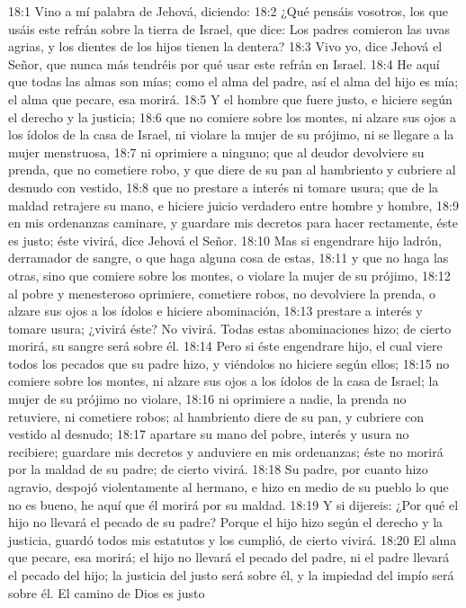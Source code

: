 18:1 Vino a mí palabra de Jehová, diciendo:   
18:2 ¿Qué pensáis vosotros, los que usáis este refrán sobre la tierra de Israel, que dice: Los padres comieron las uvas agrias, y los dientes de los hijos tienen la dentera?  
18:3 Vivo yo, dice Jehová el Señor, que nunca más tendréis por qué usar este refrán en Israel.   
18:4 He aquí que todas las almas son mías; como el alma del padre, así el alma del hijo es mía; el alma que pecare, esa morirá.   
18:5 Y el hombre que fuere justo, e hiciere según el derecho y la justicia;   
18:6 que no comiere sobre los montes, ni alzare sus ojos a los ídolos de la casa de Israel, ni violare la mujer de su prójimo, ni se llegare a la mujer menstruosa,   
18:7 ni oprimiere a ninguno; que al deudor devolviere su prenda, que no cometiere robo, y que diere de su pan al hambriento y cubriere al desnudo con vestido,   
18:8 que no prestare a interés ni tomare usura; que de la maldad retrajere su mano, e hiciere juicio verdadero entre hombre y hombre,   
18:9 en mis ordenanzas caminare, y guardare mis decretos para hacer rectamente, éste es justo; éste vivirá,  dice Jehová el Señor.   
18:10 Mas si engendrare hijo ladrón, derramador de sangre, o que haga alguna cosa de estas,   
18:11 y que no haga las otras, sino que comiere sobre los montes, o violare la mujer de su prójimo,   
18:12 al pobre y menesteroso oprimiere, cometiere robos, no devolviere la prenda, o alzare sus ojos a los ídolos e hiciere abominación,   
18:13 prestare a interés y tomare usura; ¿vivirá éste? No vivirá. Todas estas abominaciones hizo; de cierto morirá, su sangre será sobre él.   
18:14 Pero si éste engendrare hijo, el cual viere todos los pecados que su padre hizo, y viéndolos no hiciere según ellos;   
18:15 no comiere sobre los montes, ni alzare sus ojos a los ídolos de la casa de Israel; la mujer de su prójimo no violare,   
18:16 ni oprimiere a nadie, la prenda no retuviere, ni cometiere robos; al hambriento diere de su pan, y cubriere con vestido al desnudo;   
18:17 apartare su mano del pobre, interés y usura no recibiere; guardare mis decretos y anduviere en mis ordenanzas; éste no morirá por la maldad de su padre; de cierto vivirá.   
18:18 Su padre, por cuanto hizo agravio, despojó violentamente al hermano, e hizo en medio de su pueblo lo que no es bueno, he aquí que él morirá por su maldad.   
18:19 Y si dijereis: ¿Por qué el hijo no llevará el pecado de su padre? Porque el hijo hizo según el derecho y la justicia, guardó todos mis estatutos y los cumplió, de cierto vivirá.   
18:20 El alma que pecare, esa morirá; el hijo no llevará el pecado del padre, ni el padre llevará el pecado del hijo; la justicia del justo será sobre él, y la impiedad del impío será sobre él.   
El camino de Dios es justo   

